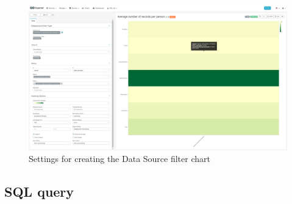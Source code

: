 \documentclass[
]{book}
\begin{document}
\begin{figure}
\includegraphics[width=1\linewidth]{images/10-data_domain/02-avg_records_per_person} \caption{Settings for creating the Data Source filter chart}\label{fig:unnamed-chunk-1}
\end{figure}

\hypertarget{sql-query-27}{%
\subsection{SQL query}\label{sql-query-27}}
\end{document}
